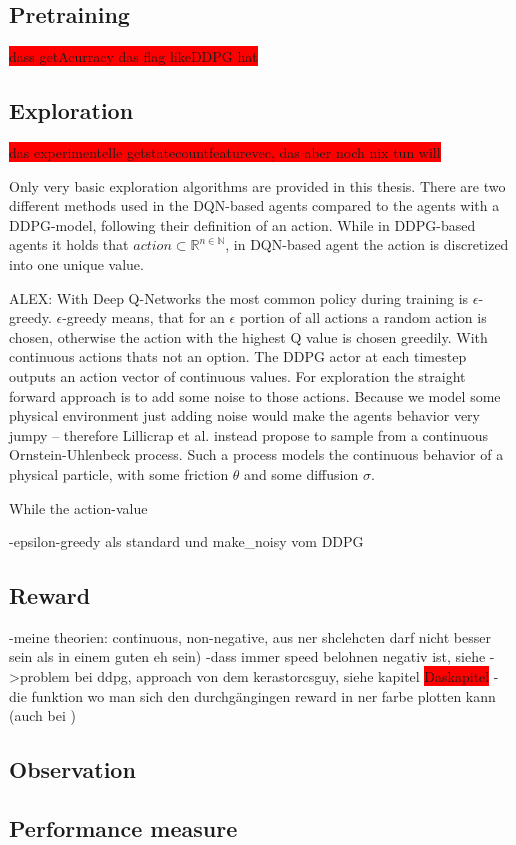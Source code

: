 \subsection{Pretraining}

\colorbox{red}{dass getAcurracy das flag likeDDPG hat}


\subsection{Exploration}

\colorbox{red}{das experimentelle getstatecountfeaturevec, das aber noch nix tun will}


Only very basic exploration algorithms are provided in this thesis. There are two different methods used in the DQN-based agents compared to the agents with a DDPG-model, following their definition of an action. While in DDPG-based agents it holds that $action \subset \mathds{R}^{n \in \mathds{N}}$, in DQN-based agent the action is discretized into one unique value. 

ALEX: 
With Deep Q-Networks the most common policy during training is $\epsilon$-greedy. $\epsilon$-greedy means, that for an $\epsilon$ portion of all actions a random action is chosen, otherwise the action with the highest Q value is chosen greedily.
With continuous actions thats not an option. The DDPG actor at each timestep outputs an action vector of continuous values. For exploration the straight forward approach is to add some noise to those actions. Because we model some physical environment just adding noise would make the agents behavior very jumpy -- therefore Lillicrap et al. instead propose to sample from a continuous Ornstein-Uhlenbeck process. Such a process models the continuous behavior of a physical particle, with some friction $\theta$ and some diffusion $\sigma$.


While the action-value 

-epsilon-greedy als standard und make_noisy vom DDPG


\subsection{Reward}

-meine theorien: continuous, non-negative, aus ner shclehcten darf nicht besser sein als in einem guten eh sein)
-dass immer speed belohnen negativ ist, siehe ->problem bei ddpg, approach von dem kerastorcsguy, siehe kapitel \colorbox{red}{Daskapitel}
-die funktion wo man sich den durchgängingen reward in ner farbe plotten kann (auch bei )

\subsection{Observation}




\subsection{Performance measure}

